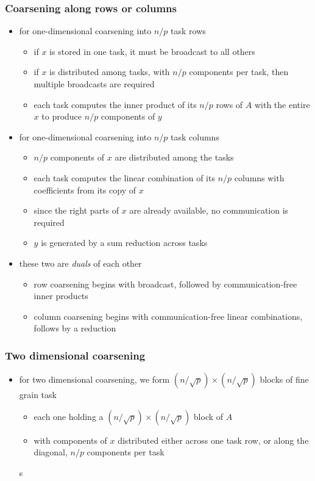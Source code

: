 \begin{frame}[fragile]
%
  \frametitle{Coarsening along rows or columns}
%
  \begin{itemize}
%
  \item for one-dimensional coarsening into $n/p$ task rows
    \begin{itemize}
    \item if $x$ is stored in one task, it must be broadcast to all others
    \item if $x$ is distributed among tasks, with $n/p$ components per task, then multiple
      broadcasts are required
    \item each task computes the inner product of its $n/p$ rows of $A$ with the entire $x$ to
      produce $n/p$ components of $y$
    \end{itemize}
%
  \item for one-dimensional coarsening into $n/p$ task columns
    \begin{itemize}
    \item $n/p$ components of $x$ are distributed among the tasks
    \item each task computes the linear combination of its $n/p$ columns with coefficients
      from its copy of $x$
    \item since the right parts of $x$ are already available, no communication is required
    \item $y$ is generated by a sum reduction across tasks
    \end{itemize}
%
  \item these two are {\em duals} of each other
    \begin{itemize}
    \item row coarsening begins with broadcast, followed by communication-free inner products
    \item column coarsening begins with communication-free linear combinations, follows by a
      reduction
    \end{itemize}
%
  \end{itemize}
%
\end{frame}

\begin{frame}[fragile]
%
  \frametitle{Two dimensional coarsening}
%
  \begin{itemize}
%
  \item for two dimensional coarsening, we form $(n/\sqrt{p}) \times (n/\sqrt{p})$ blocks of
    fine grain task
    \begin{itemize}
    \item each one holding a $(n/\sqrt{p}) \times (n/\sqrt{p})$ block of $A$
    \item with components of $x$ distributed either across one task row, or along the diagonal,
      $n/p$ components per task
    \end{itemize}
s
%
  \end{itemize}
%
\end{frame}

